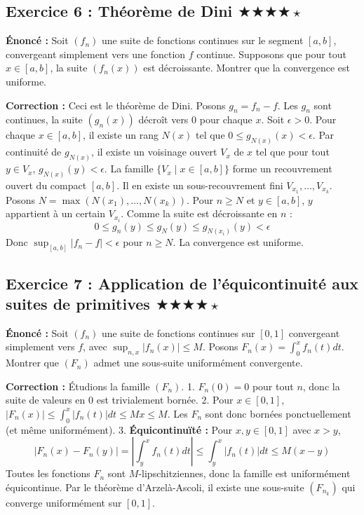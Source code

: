 \documentclass[11pt,a4paper]{article}
\begin{document}
\subsection*{Exercice 6 : Théorème de Dini \quad $\bigstar\bigstar\bigstar\bigstar\star$}

\textbf{Énoncé :}
Soit $(f_n)$ une suite de fonctions continues sur le segment $[a, b]$, convergeant simplement vers une fonction $f$ continue. Supposons que pour tout $x \in [a, b]$, la suite $(f_n(x))$ est décroissante. Montrer que la convergence est uniforme.

\textbf{Correction :}
Ceci est le théorème de Dini. Posons $g_n = f_n - f$. Les $g_n$ sont continues, la suite $(g_n(x))$ décroît vers $0$ pour chaque $x$. Soit $\epsilon > 0$.
Pour chaque $x \in [a, b]$, il existe un rang $N(x)$ tel que $0 \le g_{N(x)}(x) < \epsilon$.
Par continuité de $g_{N(x)}$, il existe un voisinage ouvert $V_x$ de $x$ tel que pour tout $y \in V_x$, $g_{N(x)}(y) < \epsilon$.
La famille $\{V_x \mid x \in [a, b]\}$ forme un recouvrement ouvert du compact $[a, b]$. Il en existe un sous-recouvrement fini $V_{x_1}, \dots, V_{x_k}$.
Posons $N = \max(N(x_1), \dots, N(x_k))$.
Pour $n \ge N$ et $y \in [a, b]$, $y$ appartient à un certain $V_{x_i}$. Comme la suite est décroissante en $n$ :
$$ 0 \le g_n(y) \le g_N(y) \le g_{N(x_i)}(y) < \epsilon $$
Donc $\sup_{[a,b]} |f_n - f| < \epsilon$ pour $n \ge N$. La convergence est uniforme.


\subsection*{Exercice 7 : Application de l'équicontinuité aux suites de primitives \quad $\bigstar\bigstar\bigstar\bigstar\star$}

\textbf{Énoncé :}
Soit $(f_n)$ une suite de fonctions continues sur $[0, 1]$ convergeant simplement vers $f$, avec $\sup_{n, x} |f_n(x)| \le M$. Posons $F_n(x) = \int_0^x f_n(t) dt$. Montrer que $(F_n)$ admet une sous-suite uniformément convergente.

\textbf{Correction :}
Étudions la famille $(F_n)$.
1. $F_n(0) = 0$ pour tout $n$, donc la suite de valeurs en $0$ est trivialement bornée.
2. Pour $x \in [0, 1]$, $|F_n(x)| \le \int_0^x |f_n(t)| dt \le Mx \le M$. Les $F_n$ sont donc bornées ponctuellement (et même uniformément).
3. \textbf{Équicontinuïté :} Pour $x, y \in [0, 1]$ avec $x > y$,
$$ |F_n(x) - F_n(y)| = \left| \int_y^x f_n(t) dt \right| \le \int_y^x |f_n(t)| dt \le M(x-y) $$
Toutes les fonctions $F_n$ sont $M$-lipschitziennes, donc la famille est uniformément équicontinue.
Par le théorème d'Arzelà-Ascoli, il existe une sous-suite $(F_{n_k})$ qui converge uniformément sur $[0, 1]$.
\end{document}
